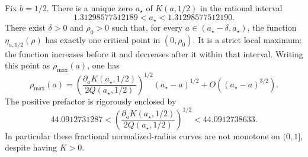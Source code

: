 \begin{theorem}
\label{rwloc:turn:thm:maximum}
Fix $b=1/2$. There is a unique zero $a_\star$ of $K(a,1/2)$ in
the rational interval
\begin{equation}\label{rwloc:turn:eq:abracket}
 1.31298577512189<a_\star<1.31298577512190.
\end{equation}
There exist $\delta>0$ and $\rho_0>0$ such that, for every
$a\in(a_\star-\delta,a_\star)$, the function
$\eta_{a,1/2}(\rho)$ has exactly one critical point in
$(0,\rho_0)$. It is a strict local maximum: the function increases
before it and decreases after it within that interval.
Writing this point as $\rho_{\max}(a)$, one has
\begin{equation}\label{rwloc:turn:eq:maximumscale}
 \rho_{\max}(a)
 =\left(\frac{\partial_aK(a_\star,1/2)}
                    {2Q(a_\star,1/2)}\right)^{1/2}
       (a_\star-a)^{1/2}
       +O((a_\star-a)^{3/2}).
\end{equation}
The positive prefactor is rigorously enclosed by
\[
 44.0912731287<
 \left(\frac{\partial_aK(a_\star,1/2)}
                    {2Q(a_\star,1/2)}\right)^{1/2}
 <44.0912738633.
\]
In particular these fractional normalized-radius curves are not
monotone on $(0,1]$, despite having $K>0$.
\end{theorem}


